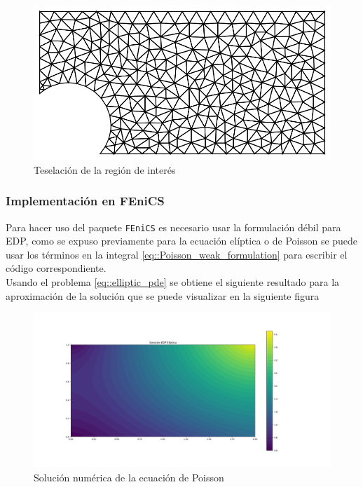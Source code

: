 \documentclass[a4paper]{article}
\begin{document}
\begin{figure}[H]
\begin{center}
\includegraphics[scale=0.42]{./elliptic_omega_mesh.png} 
\end{center} 
\caption{Teselación de la región de interés}
\label{fig::fig4}
\end{figure}
\subsubsection{Implementación en FEniCS}
Para hacer uso del paquete \texttt{FEniCS} es necesario usar la formulación débil para EDP, como se expuso previamente para la ecuación elíptica o de Poisson se puede usar los términos en la integral \ref{eq::Poisson_weak_formulation} para escribir el código correspondiente.\\
Usando el problema \ref{eq::elliptic_pde} se obtiene el siguiente resultado para la aproximación de la solución que se puede visualizar en la siguiente figura
\begin{figure}[H]
\begin{center}
\includegraphics[scale=0.3]{./elliptic_FEniCS.png} 
\end{center} 
\caption{Solución numérica de la ecuación de Poisson}
\label{fig::fig4.2}
\end{figure}
\end{document}
